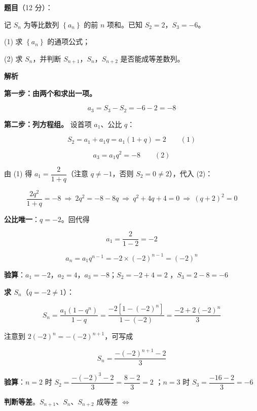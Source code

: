 \begin{answer}

\textbf{题目}（12 分）：

记 $S_n$ 为等比数列 $\left\{a_n\right\}$ 的前 $n$ 项和。已知 $S_2=2$，$S_3=-6$。

  (1) 求 $\left\{a_n\right\}$ 的通项公式；

  (2) 求 $S_n$，并判断 $S_{n+1}$，$S_n$，$S_{n+2}$ 是否能成等差数列。

\textbf{解析}


\textbf{第一步：由两个和求出一项。}

\nopagebreak[4]
\[a_3=S_3-S_2=-6-2=-8\]

\textbf{第二步：列方程组。} 设首项 $a_1$、公比 $q$：

\nopagebreak[4]
\[S_2=a_1+a_1q=a_1(1+q)=2\qquad(1)\]

\nopagebreak[4]
\[a_3=a_1q^{2}=-8\qquad(2)\]

由 (1) 得 $a_1=\dfrac2{1+q}$（注意 $q\ne-1$，否则 $S_2=0\ne2$），代入 (2)：

\nopagebreak[4]
\[\frac{2q^{2}}{1+q}=-8\ \Longrightarrow\ 2q^{2}=-8-8q\ \Longrightarrow\ q^{2}+4q+4=0\ \Longrightarrow\ (q+2)^{2}=0\]

\textbf{公比唯一}：$q=-2$。回代得

\nopagebreak[4]
\[a_1=\frac2{1-2}=-2\]

\nopagebreak[4]
\[a_n=a_1q^{n-1}=-2\times(-2)^{n-1}=(-2)^{n}\]

\textbf{验算}：$a_1=-2$，$a_2=4$，$a_3=-8$；$S_2=-2+4=2$ ，$S_3=2-8=-6$ 


\textbf{求 $S_n$}（$q=-2\ne1$）：

\nopagebreak[4]
\[S_n=\frac{a_1\left(1-q^{n}\right)}{1-q}=\frac{-2\left[1-(-2)^{n}\right]}{1-(-2)}=\frac{-2+2(-2)^{n}}3\]

注意到 $2(-2)^{n}=-(-2)^{n+1}$，可写成

\nopagebreak[4]
\[S_n=\frac{-(-2)^{n+1}-2}3\]

\textbf{验算}：$n=2$ 时 $S_2=\dfrac{-(-2)^{3}-2}3=\dfrac{8-2}3=2$ ；$n=3$ 时 $S_3=\dfrac{-16-2}3=-6$ 

\textbf{判断等差}。$S_{n+1}$、$S_n$、$S_{n+2}$ 成等差 $\iff$


\end{answer}
